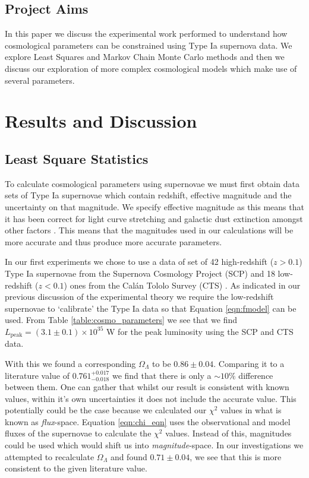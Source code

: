 \documentclass[twocolumn]{revtex4}
\begin{document}
\vspace{-4ex}
\subsection{Project Aims}
\vspace{-2ex}
In this paper we discuss the experimental work performed to understand how cosmological parameters can be constrained using Type Ia supernova data. We explore Least Squares and Markov Chain Monte Carlo methods and then we discuss our exploration of more complex cosmological models which make use of several parameters. 

\vspace{-3ex}
\section{Results and Discussion} 
\label{sec:results_discussion}
\vspace{-3ex}
\subsection{Least Square Statistics} 
\vspace{-2ex}
To calculate cosmological parameters using supernovae we must first obtain data sets of Type Ia supernovae which contain redshift, effective magnitude and the uncertainty on that magnitude. We specify effective magnitude as this means that it has been correct for light curve stretching and galactic dust extinction amongst other factors \cite{script}. This means that the magnitudes used in our calculations will be more accurate and thus produce more accurate parameters. 

In our first experiments we chose to use a data of set of 42 high-redshift ($z>0.1$) Type Ia supernovae from the Supernova Cosmology Project (SCP) and 18 low-redshift ($z<0.1$) ones from the Cal\'{a}n Tololo Survey (CTS) \cite{dataset_1}. As indicated in our previous discussion of the experimental theory we require the low-redshift supernovae to `calibrate' the Type Ia data so that Equation \ref{eqn:fmodel} can be used. From Table \ref{table:cosmo_parameters} we see that we find $L_{\text{peak}} = (3.1\pm0.1) \times 10^{35}$ W for the peak luminosity using the SCP and CTS data.

With this we found a corresponding $\Omega_\Lambda$ to be $0.86\pm0.04$. Comparing it to a literature value of $0.761^{+0.017}_{-0.018}$ \cite{cosmo_constraints} we find that there is only a $\sim 10 \%$ difference between them. One can gather that whilst our result is consistent with known values, within it's own uncertainties it does not include the accurate value. This potentially could be the case because we calculated our $\chi^2$ values in what is known as \textit{flux}-space. Equation \ref{eqn:chi_eqn} uses the observational and model fluxes of the supernovae to calculate the $\chi^2$ values. Instead of this, magnitudes could be used which would shift us into \textit{magnitude}-space. In our investigations we attempted to recalculate $\Omega_\Lambda$ and found $0.71\pm0.04$, we see that this is more consistent to the given literature value.
\end{document}
